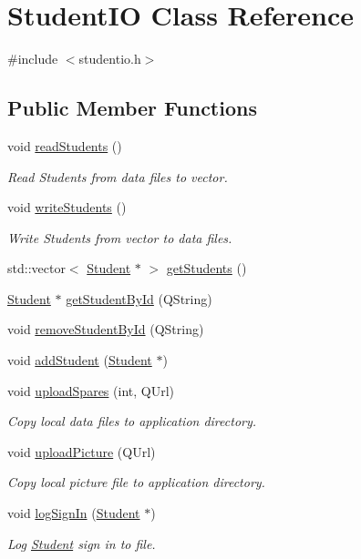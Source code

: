 \hypertarget{class_student_i_o}{}\section{Student\+IO Class Reference}
\label{class_student_i_o}


{\ttfamily \#include $<$studentio.\+h$>$}

\subsection*{Public Member Functions}
\begin{DoxyCompactItemize}
\item 
void \hyperlink{class_student_i_o_acdcab10501702f652cd46a641d8aa6ec}{read\+Students} ()
\begin{DoxyCompactList}\small\item\em Read Students from data files to vector. \end{DoxyCompactList}\item 
void \hyperlink{class_student_i_o_ac1f03a74030b8324fb12a6cd33da2df3}{write\+Students} ()
\begin{DoxyCompactList}\small\item\em Write Students from vector to data files. \end{DoxyCompactList}\item 
std\+::vector$<$ \hyperlink{class_student}{Student} $\ast$ $>$ \hyperlink{class_student_i_o_aca2e602e9d842605e2b67e8a75200f10}{get\+Students} ()
\item 
\hyperlink{class_student}{Student} $\ast$ \hyperlink{class_student_i_o_a513138a007310d8c123ba04ce1af8e4e}{get\+Student\+By\+Id} (Q\+String)
\item 
void \hyperlink{class_student_i_o_a051ee9ed55b11ade586200f4175a4225}{remove\+Student\+By\+Id} (Q\+String)
\item 
void \hyperlink{class_student_i_o_a5910dacfbf2593ff3cfddc242e3e114b}{add\+Student} (\hyperlink{class_student}{Student} $\ast$)
\item 
void \hyperlink{class_student_i_o_ad3c9ae8b97a47fb33373b51d06327bd9}{upload\+Spares} (int, Q\+Url)
\begin{DoxyCompactList}\small\item\em Copy local data files to application directory. \end{DoxyCompactList}\item 
void \hyperlink{class_student_i_o_ae12678a20ba4ca76eaa5eff8385b32d8}{upload\+Picture} (Q\+Url)
\begin{DoxyCompactList}\small\item\em Copy local picture file to application directory. \end{DoxyCompactList}\item 
void \hyperlink{class_student_i_o_a1cab9c5c4ef79743bef16a6af0b3cbdb}{log\+Sign\+In} (\hyperlink{class_student}{Student} $\ast$)
\begin{DoxyCompactList}\small\item\em Log \hyperlink{class_student}{Student} sign in to file. \end{DoxyCompactList}\end{DoxyCompactItemize}


